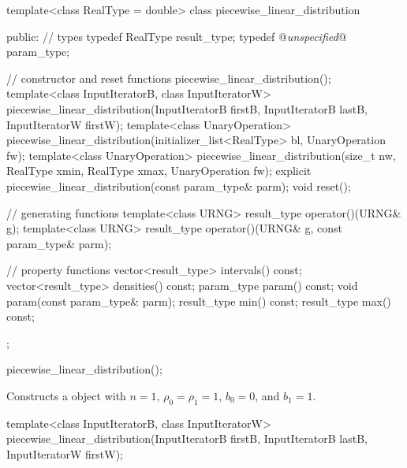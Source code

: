 \begin{codeblock}
template<class RealType = double>
 class piecewise_linear_distribution
{
public:
 // types
 typedef RealType result_type;
 typedef @\textit{unspecified}@ param_type;

 // constructor and reset functions
 piecewise_linear_distribution();
 template<class InputIteratorB, class InputIteratorW>
   piecewise_linear_distribution(InputIteratorB firstB, InputIteratorB lastB,
                                 InputIteratorW firstW);
 template<class UnaryOperation>
   piecewise_linear_distribution(initializer_list<RealType> bl, UnaryOperation fw);
 template<class UnaryOperation>
   piecewise_linear_distribution(size_t nw, RealType xmin, RealType xmax, UnaryOperation fw);
 explicit piecewise_linear_distribution(const param_type& parm);
 void reset();

 // generating functions
 template<class URNG>
   result_type operator()(URNG& g);
 template<class URNG>
   result_type operator()(URNG& g, const param_type& parm);

 // property functions
 vector<result_type> intervals() const;
 vector<result_type> densities() const;
 param_type param() const;
 void param(const param_type& parm);
 result_type min() const;
 result_type max() const;
};
\end{codeblock}

\begin{itemdecl}
piecewise_linear_distribution();
\end{itemdecl}

\begin{itemdescr}
\pnum\effects Constructs a  object
 with $ n = 1 $,
 $\rho_0 = \rho_1 = 1 $,
 $ b_0 = 0 $,
 and $ b_1 = 1 $.
\end{itemdescr}

\begin{itemdecl}
template<class InputIteratorB, class InputIteratorW>
 piecewise_linear_distribution(InputIteratorB firstB, InputIteratorB lastB,
                               InputIteratorW firstW);
\end{itemdecl}

